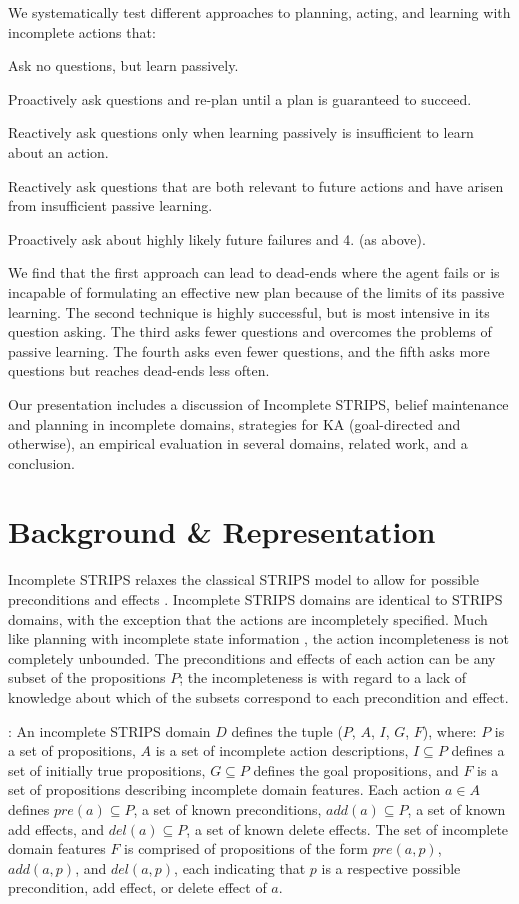 \documentclass[letterpaper]{article}
\def\und#1{\noindent{\bf #1}:}
\def\citep#1{\cite{#1}}
\newenvironment{packed_enum}{
\begin{enumerate}
  \setlength{\itemsep}{1pt}
  \setlength{\parskip}{0pt}
  \setlength{\parsep}{0pt}
}{\end{enumerate}}
\begin{document}
We systematically test different approaches to planning, acting, and learning
with incomplete actions that:
\begin{packed_enum}
\item Ask no questions, but learn passively. 
\item Proactively ask questions and re-plan until a plan is guaranteed to
succeed.
\item Reactively ask questions only when learning passively is insufficient to
learn about an action.
\item Reactively ask questions that are both relevant to future actions and have
arisen from insufficient passive learning.
\item  Proactively ask about highly likely future failures and 4. (as above).
\end{packed_enum}
We find that the first approach can lead to dead-ends where the agent fails or
is incapable of formulating an effective new plan because of the limits of its
passive learning. The second technique is highly successful, but is
most intensive in its question asking. The third asks fewer questions and
overcomes the problems of passive learning. The fourth asks even fewer
questions, and the fifth asks more questions but reaches dead-ends less often.

Our presentation includes a discussion of Incomplete STRIPS, belief maintenance
and planning in incomplete domains, strategies for KA
(goal-directed and otherwise), an empirical evaluation in several domains,
related work, and a conclusion.

\section{Background \& Representation}\label{sec:background}

Incomplete STRIPS relaxes the classical STRIPS model to allow for
possible preconditions and effects \citep{Garland02}.  
Incomplete STRIPS domains are identical to STRIPS domains, with the exception
that the actions are incompletely specified.  Much like planning with incomplete
state information \citep{bonet00planning}, the action incompleteness is not
completely unbounded.  The preconditions and effects of each action can be any
subset of the propositions $P$; the incompleteness is with regard to a lack of
knowledge about which of the subsets correspond to each precondition and effect.        

\und{Incomplete STRIPS Domains} An incomplete STRIPS domain ${D}$  defines the
tuple ($P$, ${A}$, $I$, $G$, $F$), where: $P$ is a  set of propositions, ${A}$
is a set of incomplete  action descriptions, $I \subseteq P$ defines a set of
initially true  propositions, $G \subseteq P$ defines the goal propositions, and
$F$ is a set of propositions describing incomplete domain features. Each action
${a} \in {A}$ defines $pre({a}) \subseteq P$, a set of known preconditions,
$add({a}) \subseteq P$, a set of known add  effects, and $del({a}) \subseteq P$,
a set of known delete effects.   The set of incomplete domain features $F$ is
comprised of propositions of the form $pre({a}, p)$, $add({a}, p)$, and
$del({a}, p)$, each indicating that $p$ is a respective possible precondition, add effect, or
delete effect of $a$.
\end{document}
